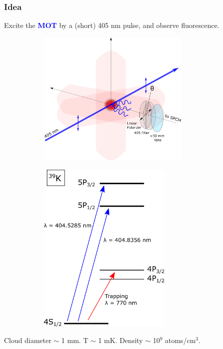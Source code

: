 \documentclass{beamer}
\theoremstyle{definition}
\begin{document}
\begin{frame}
\frametitle{Idea}
Excite the \textcolor{blue}{\textbf{MOT}} by a (short) 405 nm pulse, and observe fluorescence.
\begin{figure}[!htb]
	\vspace{-10pt}
	\centering
	\begin{subfigure}{0.55\textwidth}
	\includegraphics[width=0.8\textwidth]{experimental_geometry}
	\end{subfigure}
	\begin{subfigure}{0.4\textwidth}
	\includegraphics[width=0.7\textwidth]{energy_levels.png}
	\end{subfigure}
\end{figure}

Cloud diameter $\sim$ 1 mm. T $\sim$ 1 mK. Density $\sim$ 10$^\text{9}$ atoms/cm$^\text{3}$.

\end{frame}
\end{document}
